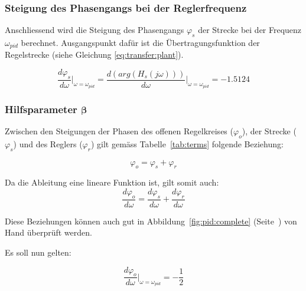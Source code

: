 \subsubsection{Steigung des Phasengangs bei der Reglerfrequenz}

Anschliessend   wird   die   Steigung    des   Phasengangs   $\varphi_s$   der
Strecke  bei  der  Frequenz  $\omega_{pid}$  berechnet. Ausgangspunkt  daf\"ur
ist   die    \"Ubertragungsfunktion   der   Regelstrecke    (siehe   Gleichung
\ref{eq:transfer:plant}).

\begin{equation} \label{eq:transfer:plant:derivative}
    \frac{d\varphi_s}{d\omega} \biggr \rvert_{\omega=\omega_{pid}}
        = \frac{d(arg(H_s(j\omega)))}{d\omega} \biggr \rvert_{\omega=\omega_{pid}}
        = -1.5124
\end{equation}


\subsubsection{Hilfsparameter $\boldsymbol{\beta}$}

Zwischen  den Steigungen  der Phasen  des offenen  Regelkreises ($\varphi_o$),
der  Strecke  ($\varphi_s$)  und   des  Reglers  ($\varphi_r$)  gilt  gem\"ass
Tabelle~\ref{tab:terms} folgende Beziehung:

\begin{equation} \label{eq:pid:phi_sum}
    \varphi_o = \varphi_s + \varphi_r
\end{equation}

Da die Ableitung eine lineare Funktion ist, gilt somit auch:
\begin{equation} \label{eq:pid:dphi_sum}
    \frac{d\varphi_o}{d\omega} = \frac{d\varphi_s}{d\omega} + \frac{d\varphi_r}{d\omega}
\end{equation}

Diese  Beziehungen  k\"onnen   auch  gut  in  Abbildung~\ref{fig:pid:complete}
(Seite~\pageref{fig:pid:complete}) von Hand \"uberpr\"uft werden.

Es soll nun gelten:

\begin{equation} \label{eq:pid:dphi_o_target}
    \frac{d\varphi_o}{d\omega} \biggr \rvert_{\omega=\omega_{pid}} = - \frac{1}{2}
\end{equation}

